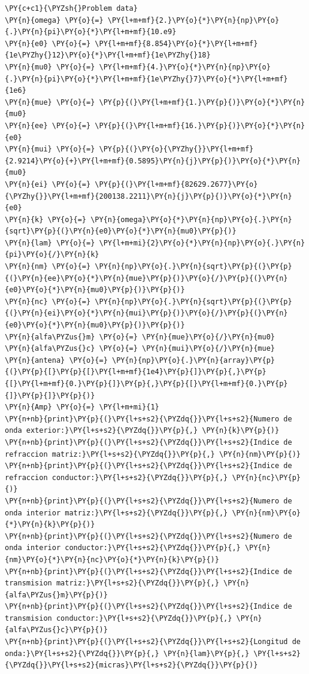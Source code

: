 \begin{tcolorbox}
\begin{Verbatim}[commandchars=\\\{\}]
 \PY{c+c1}{\PYZsh{}Problem data}
\PY{n}{omega} \PY{o}{=} \PY{l+m+mf}{2.}\PY{o}{*}\PY{n}{np}\PY{o}{.}\PY{n}{pi}\PY{o}{*}\PY{l+m+mf}{10.e9}
\PY{n}{e0} \PY{o}{=} \PY{l+m+mf}{8.854}\PY{o}{*}\PY{l+m+mf}{1e\PYZhy{}12}\PY{o}{*}\PY{l+m+mf}{1e\PYZhy{}18}
\PY{n}{mu0} \PY{o}{=} \PY{l+m+mf}{4.}\PY{o}{*}\PY{n}{np}\PY{o}{.}\PY{n}{pi}\PY{o}{*}\PY{l+m+mf}{1e\PYZhy{}7}\PY{o}{*}\PY{l+m+mf}{1e6}
\PY{n}{mue} \PY{o}{=} \PY{p}{(}\PY{l+m+mf}{1.}\PY{p}{)}\PY{o}{*}\PY{n}{mu0}
\PY{n}{ee} \PY{o}{=} \PY{p}{(}\PY{l+m+mf}{16.}\PY{p}{)}\PY{o}{*}\PY{n}{e0}
\PY{n}{mui} \PY{o}{=} \PY{p}{(}\PY{o}{\PYZhy{}}\PY{l+m+mf}{2.9214}\PY{o}{+}\PY{l+m+mf}{0.5895}\PY{n}{j}\PY{p}{)}\PY{o}{*}\PY{n}{mu0}
\PY{n}{ei} \PY{o}{=} \PY{p}{(}\PY{l+m+mf}{82629.2677}\PY{o}{\PYZhy{}}\PY{l+m+mf}{200138.2211}\PY{n}{j}\PY{p}{)}\PY{o}{*}\PY{n}{e0}
\PY{n}{k} \PY{o}{=} \PY{n}{omega}\PY{o}{*}\PY{n}{np}\PY{o}{.}\PY{n}{sqrt}\PY{p}{(}\PY{n}{e0}\PY{o}{*}\PY{n}{mu0}\PY{p}{)}
\PY{n}{lam} \PY{o}{=} \PY{l+m+mi}{2}\PY{o}{*}\PY{n}{np}\PY{o}{.}\PY{n}{pi}\PY{o}{/}\PY{n}{k}
\PY{n}{nm} \PY{o}{=} \PY{n}{np}\PY{o}{.}\PY{n}{sqrt}\PY{p}{(}\PY{p}{(}\PY{n}{ee}\PY{o}{*}\PY{n}{mue}\PY{p}{)}\PY{o}{/}\PY{p}{(}\PY{n}{e0}\PY{o}{*}\PY{n}{mu0}\PY{p}{)}\PY{p}{)}
\PY{n}{nc} \PY{o}{=} \PY{n}{np}\PY{o}{.}\PY{n}{sqrt}\PY{p}{(}\PY{p}{(}\PY{n}{ei}\PY{o}{*}\PY{n}{mui}\PY{p}{)}\PY{o}{/}\PY{p}{(}\PY{n}{e0}\PY{o}{*}\PY{n}{mu0}\PY{p}{)}\PY{p}{)}
\PY{n}{alfa\PYZus{}m} \PY{o}{=} \PY{n}{mue}\PY{o}{/}\PY{n}{mu0}
\PY{n}{alfa\PYZus{}c} \PY{o}{=} \PY{n}{mui}\PY{o}{/}\PY{n}{mue}
\PY{n}{antena} \PY{o}{=} \PY{n}{np}\PY{o}{.}\PY{n}{array}\PY{p}{(}\PY{p}{[}\PY{p}{[}\PY{l+m+mf}{1e4}\PY{p}{]}\PY{p}{,}\PY{p}{[}\PY{l+m+mf}{0.}\PY{p}{]}\PY{p}{,}\PY{p}{[}\PY{l+m+mf}{0.}\PY{p}{]}\PY{p}{]}\PY{p}{)}
\PY{n}{Amp} \PY{o}{=} \PY{l+m+mi}{1}
\PY{n+nb}{print}\PY{p}{(}\PY{l+s+s2}{\PYZdq{}}\PY{l+s+s2}{Numero de onda exterior:}\PY{l+s+s2}{\PYZdq{}}\PY{p}{,} \PY{n}{k}\PY{p}{)}
\PY{n+nb}{print}\PY{p}{(}\PY{l+s+s2}{\PYZdq{}}\PY{l+s+s2}{Indice de refraccion matriz:}\PY{l+s+s2}{\PYZdq{}}\PY{p}{,} \PY{n}{nm}\PY{p}{)}
\PY{n+nb}{print}\PY{p}{(}\PY{l+s+s2}{\PYZdq{}}\PY{l+s+s2}{Indice de refraccion conductor:}\PY{l+s+s2}{\PYZdq{}}\PY{p}{,} \PY{n}{nc}\PY{p}{)}
\PY{n+nb}{print}\PY{p}{(}\PY{l+s+s2}{\PYZdq{}}\PY{l+s+s2}{Numero de onda interior matriz:}\PY{l+s+s2}{\PYZdq{}}\PY{p}{,} \PY{n}{nm}\PY{o}{*}\PY{n}{k}\PY{p}{)}
\PY{n+nb}{print}\PY{p}{(}\PY{l+s+s2}{\PYZdq{}}\PY{l+s+s2}{Numero de onda interior conductor:}\PY{l+s+s2}{\PYZdq{}}\PY{p}{,} \PY{n}{nm}\PY{o}{*}\PY{n}{nc}\PY{o}{*}\PY{n}{k}\PY{p}{)}
\PY{n+nb}{print}\PY{p}{(}\PY{l+s+s2}{\PYZdq{}}\PY{l+s+s2}{Indice de transmision matriz:}\PY{l+s+s2}{\PYZdq{}}\PY{p}{,} \PY{n}{alfa\PYZus{}m}\PY{p}{)}
\PY{n+nb}{print}\PY{p}{(}\PY{l+s+s2}{\PYZdq{}}\PY{l+s+s2}{Indice de transmision conductor:}\PY{l+s+s2}{\PYZdq{}}\PY{p}{,} \PY{n}{alfa\PYZus{}c}\PY{p}{)}
\PY{n+nb}{print}\PY{p}{(}\PY{l+s+s2}{\PYZdq{}}\PY{l+s+s2}{Longitud de onda:}\PY{l+s+s2}{\PYZdq{}}\PY{p}{,} \PY{n}{lam}\PY{p}{,} \PY{l+s+s2}{\PYZdq{}}\PY{l+s+s2}{micras}\PY{l+s+s2}{\PYZdq{}}\PY{p}{)}
\end{Verbatim}
\end{tcolorbox}

